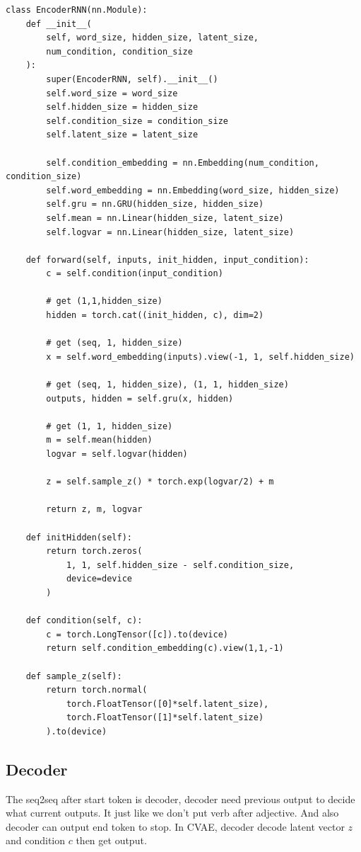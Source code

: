 \documentclass[12pt]{article}
\begin{document}
\begin{verbatim}
class EncoderRNN(nn.Module):
    def __init__(
        self, word_size, hidden_size, latent_size, 
        num_condition, condition_size
    ):
        super(EncoderRNN, self).__init__()
        self.word_size = word_size
        self.hidden_size = hidden_size
        self.condition_size = condition_size
        self.latent_size = latent_size

        self.condition_embedding = nn.Embedding(num_condition, condition_size)
        self.word_embedding = nn.Embedding(word_size, hidden_size)
        self.gru = nn.GRU(hidden_size, hidden_size)
        self.mean = nn.Linear(hidden_size, latent_size)
        self.logvar = nn.Linear(hidden_size, latent_size)

    def forward(self, inputs, init_hidden, input_condition):
        c = self.condition(input_condition)
        
        # get (1,1,hidden_size)
        hidden = torch.cat((init_hidden, c), dim=2)
        
        # get (seq, 1, hidden_size)
        x = self.word_embedding(inputs).view(-1, 1, self.hidden_size)
        
        # get (seq, 1, hidden_size), (1, 1, hidden_size)
        outputs, hidden = self.gru(x, hidden)
        
        # get (1, 1, hidden_size)
        m = self.mean(hidden)
        logvar = self.logvar(hidden)
        
        z = self.sample_z() * torch.exp(logvar/2) + m
        
        return z, m, logvar

    def initHidden(self):
        return torch.zeros(
            1, 1, self.hidden_size - self.condition_size, 
            device=device
        )
    
    def condition(self, c):
        c = torch.LongTensor([c]).to(device)
        return self.condition_embedding(c).view(1,1,-1)
    
    def sample_z(self):
        return torch.normal(
            torch.FloatTensor([0]*self.latent_size), 
            torch.FloatTensor([1]*self.latent_size)
        ).to(device)
\end{verbatim}

\subsection{Decoder}

The seq2seq after start token is decoder, decoder need previous output to decide what current outputs. It just like we don't put verb after adjective. And also decoder can output end token to stop. In CVAE, decoder decode latent vector $z$ and condition $c$ then get output.
\end{document}
